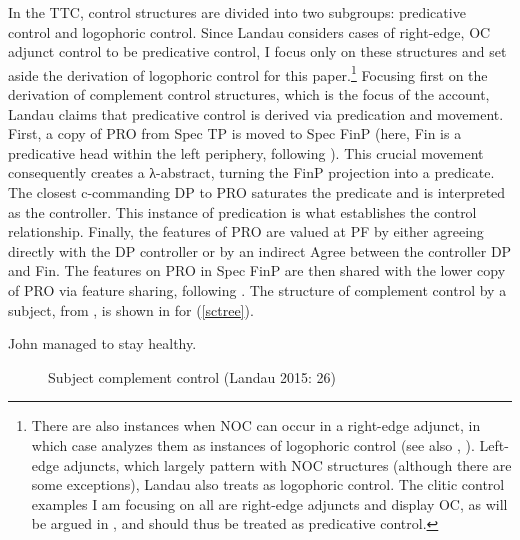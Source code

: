 \documentclass[output=paper,colorlinks,citecolor=brown]{langscibook}
\begin{document}
In the TTC, control structures are divided into two subgroups: predicative control and logophoric control. Since Landau considers cases of right-edge, OC adjunct control to be predicative control, I focus only on these structures and set aside the derivation of logophoric control for this paper.\footnote{There are also instances when NOC can occur in a right-edge adjunct, in which case \citet{landau2017} analyzes them as instances of logophoric control (see also \citealt{green2018adjunct}, \citeyear{green2019movement}). Left-edge adjuncts, which largely pattern with NOC structures (although there are some exceptions), Landau also treats as logophoric control. The clitic control examples I am focusing on all are right-edge adjuncts and display OC, as will be argued in , and should thus be treated as predicative control.} Focusing first on the derivation of complement control structures, which is the focus of the account, Landau claims that predicative control is derived via predication and movement. First, a copy of PRO from Spec TP is moved to Spec FinP (here, Fin is a predicative head within the left periphery, following \citealt{rizzi1997fine}). This crucial movement consequently creates a λ-abstract, turning the FinP projection into a predicate. The closest c-commanding DP to PRO saturates the predicate and is interpreted as the controller. This instance of predication is what establishes the control relationship. Finally, the features of PRO are valued at PF by either agreeing directly with the DP controller or by an indirect Agree between the controller DP and Fin. The features on PRO in Spec FinP are then shared with the lower copy of PRO via feature sharing, following \citet{pesetsky2007syntax}. The structure of complement control by a subject, from \citet[26]{landau2015}, is shown in  for (\ref{sctree}).


\ea \label{sctree} John managed to stay healthy. 
\z

\begin{figure}
\caption{Subject complement control (Landau 2015: 26)}
\label{fig:sctree}
\end{figure}
\end{document}
